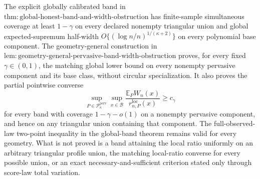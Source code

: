 The explicit globally calibrated band in \(\mathrm{thm:global\text{-}honest\text{-}band\text{-}and\text{-}width\text{-}obstruction}\) has finite-sample simultaneous coverage at least \(1-\gamma\) on every declared nonempty triangular union and global expected-supremum half-width \(O\{(\log n/n)^{1/(\kappa+2)}\}\) on every polynomial base component. The geometry-general construction in \(\mathrm{lem:geometry\text{-}general\text{-}pervasive\text{-}band\text{-}width\text{-}obstruction}\) proves, for every fixed \(\gamma\in(0,1)\), the matching global lower bound on every nonempty pervasive component and its base class, without circular specialization. It also proves the partial pointwise converse
\[
 \sup_{P\in\mathcal P_{\kappa}^{\mathrm{perv}}}\sup_{x\in\mathcal B}
 \frac{\mathbb E_PW_n(x)}{r_{n,P}^{\mathrm{loc}}(x)}\ge c_\gamma
\]
for every band with coverage \(1-\gamma-o(1)\) on a nonempty pervasive component, and hence on any triangular union containing that component. The full-observed-law two-point inequality in the global-band theorem remains valid for every geometry. What is not proved is a band attaining the local ratio uniformly on an arbitrary triangular profile union, the matching local-ratio converse for every possible union, or an exact necessary-and-sufficient criterion stated only through score-law total variation.